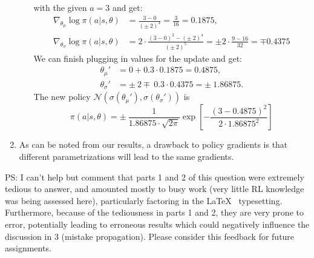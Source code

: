 \documentclass{article}
\begin{document}
\begin{enumerate}
\begin{enumerate}
		            with the given $a=3$ and get:
		            \begin{align*}
			            \nabla_{\theta_\mu} \log \pi(a|s, \theta)    & = \frac{3-0}{(\pm~2)^4}
			            = \frac{3}{16} = 0.1875,                                               \\
			            \nabla_{\theta_\sigma} \log \pi(a|s, \theta) & = 2 \cdot \frac{
				            (3-0)^2-(\pm~2)^4 }{(\pm ~2)^5} = \pm 2 \cdot \frac{9 - 16}{32} = \mp 0.4375
		            \end{align*}
		            We can finish plugging in values for the update and get:
		            \begin{align}
			            \theta_\mu'    & =  0 + 0.3 \cdot 0.1875 = 0.4875,               \\
			            \theta_\sigma' & =  \pm~ 2 \mp~ 0.3 \cdot 0.4375 = \pm~ 1.86875.
		            \end{align}
		            The new policy $\mathcal{N}(\sigma(\theta_\mu'), \sigma(\theta_\sigma'))$ is
		            \begin{equation}
			            \pi(a|s, \theta) = \pm~ \frac{1}{1.86875 \cdot \sqrt{2 \pi}}\exp\left[-\frac{(3
					            - 0.4875)^2}{2 \cdot 1.86875^2}\right]
		            \end{equation}
	      \end{enumerate}
	\item As can be noted from our results, a drawback to policy gradients is that different
	      parametrizations will lead to the same gradients.
\end{enumerate}

PS: I can't help but comment that parts 1 and 2 of this question were extremely tedious to answer,
and amounted mostly to busy work (very little RL knowledge was being assessed here), particularly
factoring in the \LaTeX~ typesetting. Furthermore, because of the tediousness in parts 1 and 2, they
are very prone to error, potentially leading to erroneous results which could negatively influence
the discussion in 3 (mistake propagation). Please consider this feedback for future assignments.
\end{document}
